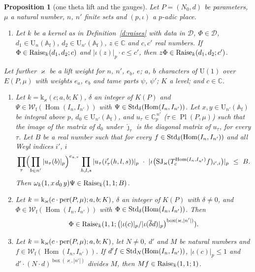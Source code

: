 \documentclass[11pt,a4paper]{article}
\theoremstyle{plainx}
\newtheorem{proposition}[theorem]{Proposition}
\theoremstyle{uprightx}
\newcommand{\CC}{\mathbb{C}}
\newcommand{\Cp}{\CC_p}
\newcommand{\np}[1]{|#1|_p}
\newcommand{\cj}[1]{\overline{#1}}
\newcommand{\Af}{\mathbb{A}_{\mathrm{f}}}
\newcommand{\KP}[1]{K(#1)}
\newcommand{\EP}[2]{E(#1,#2)}
\newcommand{\PlP}[2]{\operatorname{Pl}(#1,#2)}
\newcommand{\Wf}[1]{\mathcal{W}_{\mathrm{f}}(#1)}
\newcommand{\jet}[3]{T^{#1}_{#2}#3}
\newcommand{\Uf}[1]{\mathrm{U}_{#1}(\Af)}
\newcommand{\stdsp}[1]{I_{#1}}
\newcommand{\homsp}[2]{\operatorname{Hom}(\stdsp{#1},\stdsp{#2})}
\newcommand{\boxes}[2]{\operatorname{box}(#1,#2)}
\newcommand{\schurjet}[2]{\operatorname{SJ}_{#1}(#2)}
\newcommand{\thker}[5]{\mathrm{k}_{#1}(#2;#3,#4;#5)}
\begin{document}
\begin{proposition}[one theta lift and the gauges]\label{p:raises}
Let $P=(N_0,d)$ be parameters, $\mu$ a natural number, $n$, $n'$ finite sets and $(p,\iota)$ a $p$-adic place.
\begin{enumerate}[label=(\alph*),itemsep=2pt]
\item Let $k$ be a kernel as in Definition~\ref{d:raises} with data in $\mathcal{D}$, $\Phi\in\mathcal{D}$,
$d_1\in\Uf{n}$, $d_2\in\Uf{n'}$, $z\in\CC$ and $c,c'$ real numbers. If $\Phi\in\mathrm{Raise}_{k}(d_1,d_2;c)$ and
$\np{\iota(z)}\cdot c\le c'$, then $z\Phi\in\mathrm{Raise}_{k}(d_1,d_2;c')$.
\end{enumerate}
Let further $\varkappa$ be a lift weight for $n$, $n'$, $e_b$, $e$; $a$, $b$ characters of $\mathrm{U}(1)$ over
$\EP{P}{\mu}$ with weights $e_a$, $e_b$ and tame parts $\psi$, $\psi'$; $K$ a level; and $c\in\CC$.
\begin{enumerate}[label=(\alph*),itemsep=2pt,start=2]
\item Let $k=\thker{\varkappa}{c}{a}{b}{K}$, $\delta$ an integer of $\KP{P}$ and $\Psi\in\Wf{\homsp{n}{n'}}$ with
$\Psi\in\Std{\homsp{n}{n'}}{\delta}$. Let $x,y\in\Uf{n'}$ be integral above $p$, $d_0\in\Uf{n'}$, and
$u_\tau\in\Cp^{\,n'}$ ($\tau\in\PlP{P}{\mu}$) such that the image of the matrix of $d_0$ under $\hat\jmath_\tau$ is
the diagonal matrix of $u_\tau$, for every $\tau$. Let $B$ be a real number such that for every
$f\in\Std{\homsp{n}{n'}}{\delta}$ and all Weyl indices $i'$, $i$
\[\prod_\tau\Bigl(\prod_{b\in n'}\np{u_\tau(b)}\Bigr)^{e_{a,\tau}}\prod_{h,l,s}\np{u_\tau(i'_\tau(h,l,s))}\ \cdot\
\np{\iota\bigl(\schurjet{\varkappa}{\jet{\homsp{n}{n'}}{c}{f}}_{i',i}\bigr)}\ \le\ B .\]
Then $\omega_k(1,x\,d_0\,y)\Psi\in\mathrm{Raise}_{k}(1,1;B)$.
\item Let $k=\thker{\varkappa}{c\cdot\per{P}{\mu}}{a}{b}{K}$, $\delta$ an integer of $\KP{P}$ with $\delta\ne0$, and
$\Phi\in\Wf{\homsp{n}{n'}}$ with $\Phi\in\Std{\homsp{n}{n'}}{\delta}$. Then
\[\Phi\in\Rais{k}{1}{1}{\bigl(\np{\iota(c)}/\np{\iota(\cj\delta d)}\bigr)^{\boxes{\varkappa}{|n'|}}} .\]
\item Let $k=\thker{\varkappa}{c\cdot\per{P}{\mu}}{a}{b}{K}$, let $N\ne0$, $d'$ and $M$ be natural numbers and
$f\in\Wf{\homsp{n}{n'}}$. If $d'f\in\Std{\homsp{n}{n'}}{N}$, $\np{\iota(c)}\le1$ and
$d'\cdot(N\cdot d)^{\boxes{\varkappa}{|n'|}}$ divides $M$, then $Mf\in\mathrm{Raise}_{k}(1,1;1)$.
\end{enumerate}
\end{proposition}
\end{document}
